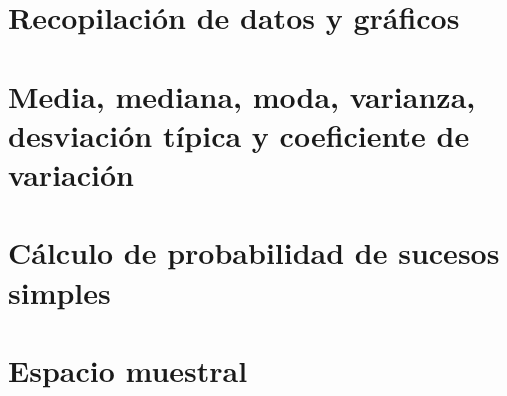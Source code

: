 
\section{Recopilación de datos y gráficos}



\section{Media, mediana, moda, varianza, desviación típica y coeficiente de variación}



\section{Cálculo de probabilidad de sucesos simples}



\section{Espacio muestral}



